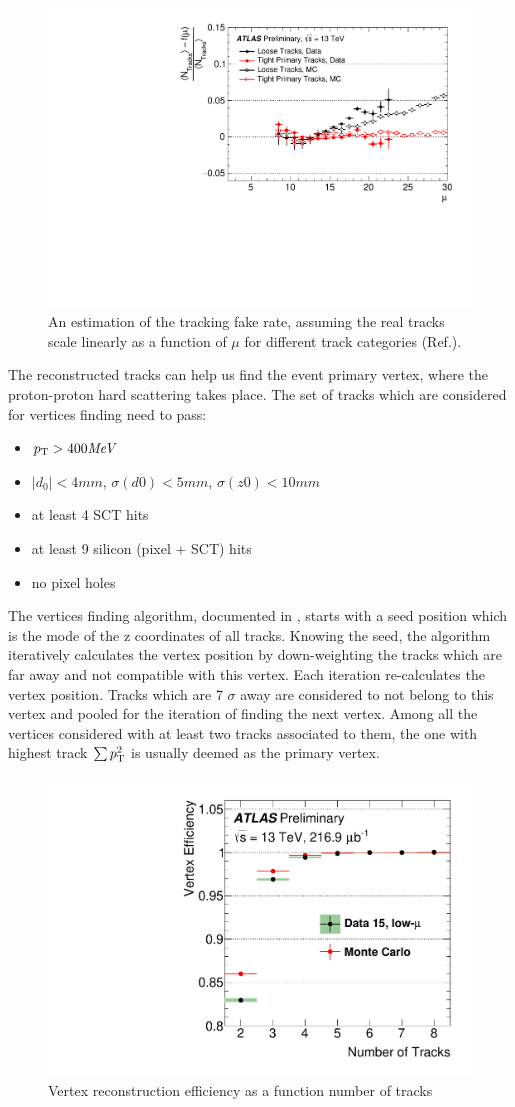 \begin{figure}[htpb!]
\begin{center}
  \includegraphics[width=0.55\linewidth]{figures/Reco/TrackingFake}
\caption{An estimation of the tracking fake rate, assuming the real tracks scale linearly as a function of $\mu$ for different track categories (Ref.\cite{ATL-PHYS-PUB-2015-051}). }
\label{fig:reco-trackingfake}
\end{center}
\end{figure}


The reconstructed tracks can help us find the event primary vertex, where the proton-proton hard scattering takes place. The set of tracks which are considered for vertices finding need to pass:

\begin{itemize}
\item $p_{{\rm T}} > 400 \textit{MeV}$
\item $|d_0|<4mm$, $\sigma(d0) < 5 mm$, $\sigma(z0) < 10 mm$
\item at least 4 SCT hits
\item at least 9 silicon (pixel + SCT) hits
\item no pixel holes
\end{itemize}

The vertices finding algorithm, documented in \cite{PERF-2015-01}, starts with a seed position which is the mode of the z coordinates of all tracks. Knowing the seed, the algorithm iteratively calculates the vertex position by down-weighting the tracks which are far away and not compatible with this vertex. Each iteration re-calculates the vertex position. Tracks which are 7 $\sigma$ away are considered to not belong to this vertex and pooled for the iteration of finding the next vertex. Among all the vertices considered with at least two tracks associated to them, the one with highest track $\sum p_{{\rm T}}^2$ is usually deemed as the primary vertex.

\begin{figure}[htpb!]
\begin{center}
  \includegraphics[width=0.55\linewidth]{figures/Reco/TrackingVertex}
\caption{Vertex reconstruction efficiency as a function number of tracks\cite{ATL-PHYS-PUB-2015-026}}
\label{fig:reco-primaryvertexeff}
\end{center}
\end{figure}



